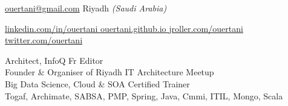 \documentclass[10pt,a4paper]{article}
\begin{document}
\sloppy  %



\thispagestyle{empty} %

\nobreakvspace{0.3em}  %

\href{mailto:ouertani.at.gmail.dot.com}{ouertani\mbox{}@\mbox{}gmail.com}\sbull
{} \sbull
{ Riyadh} \emph{(Saudi Arabia)}

\href{http://linkedin.com/in/ouertani }{linkedin.com/in/ouertani }\sbull
\href{http://ouertani.github.io }{ouertani.github.io }\sbull
\href{http://jroller.com/ouertani }{jroller.com/ouertani }\sbull
\href{http://twitter.com/ouertani }{twitter.com/ouertani }


\begin{center}
      \Large Architect, InfoQ Fr Editor \\
      Founder \& Organiser of Riyadh IT Architecture Meetup \\
      Big Data Science, Cloud \& SOA  Certified Trainer \\
      \large Togaf, Archimate, SABSA, PMP, Spring, Java, Cmmi, ITIL, Mongo, Scala
 \end{center}


\spacedhrule{0.9em}{-0.4em}  %

\end{document}

